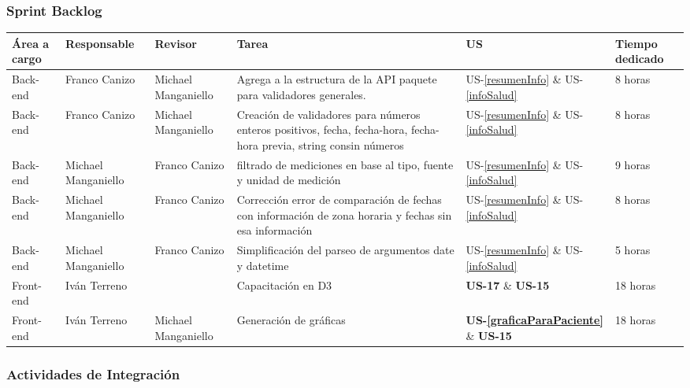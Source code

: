\subsubsection{Sprint Backlog}
{\scriptsize
	\begin{center} %
		\centering
		\resizebox{\textwidth}{!}
		{
			\begin{tabular}{|l|l|l|p{5cm}|l|p{1cm}|}
				\hline
				\textbf{Área a cargo} &
				\textbf{Responsable} &        
				\textbf{Revisor} &        	        
				\textbf{Tarea} &
				\textbf{US} &
				\textbf{Tiempo dedicado} \\
				\hline
				
				Back-end& Franco Canizo& Michael Manganiello & Agrega a la estructura de la API paquete para validadores generales.  & US-\ref{resumenInfo} \& US-\ref{infoSalud}& 8 horas\\ \hline
				Back-end& Franco Canizo& Michael Manganiello & Creación de validadores para números enteros positivos, fecha, fecha-hora, fecha-hora previa, string con\/sin números  & US-\ref{resumenInfo} \& US-\ref{infoSalud} & 8 horas\\ \hline
				Back-end& Michael Manganiello& Franco Canizo & filtrado de mediciones en base al tipo, fuente y unidad de medición & US-\ref{resumenInfo} \& US-\ref{infoSalud}& 9 horas \\ \hline
				Back-end& Michael Manganiello& Franco Canizo & Corrección error de comparación de fechas con información de zona horaria y fechas sin esa información & US-\ref{resumenInfo} \& US-\ref{infoSalud} & 8 horas\\ \hline
				Back-end& Michael Manganiello& Franco Canizo & Simplificación del parseo de argumentos date y datetime & US-\ref{resumenInfo} \& US-\ref{infoSalud} & 5 horas \\ \hline        
				Front-end& Iván Terreno & & Capacitación en D3 & \textbf{US-17} \& \textbf{US-15} & 18 horas \\ \hline
				Front-end& Iván Terreno& Michael Manganiello & Generación de gráficas & \textbf{US-\ref{graficaParaPaciente}} \& \textbf{US-15} & 18 horas \\ \hline        
			\end{tabular}
		}
	\end{center}
}


\subsubsection{Actividades de Integración}

